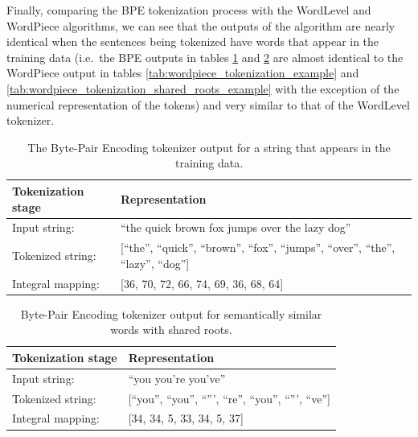 \documentclass[12pt]{article}
\begin{document}
Finally, comparing the BPE tokenization process with the WordLevel and WordPiece algorithms, we can see that the outputs of the algorithm are nearly
identical when the sentences being tokenized have words that appear in the training data (i.e.~the BPE outputs in tables
\ref{tab:bpe_tokenization_example} and \ref{tab:bpe_shared_roots_example} are almost identical to the WordPiece output in tables
\ref{tab:wordpiece_tokenization_example} and \ref{tab:wordpiece_tokenization_shared_roots_example} with the exception of the numerical representation
of the tokens) and very similar to that of the WordLevel tokenizer.

\begin{table}[!t]
    \centering
    \begin{tabular}{l l}
        \toprule
        Tokenization stage & Representation                                                                            \\
        \midrule
        Input string:      & ``the quick brown fox jumps over the lazy dog''                                           \\
        Tokenized string:  & [``the'', ``quick'', ``brown'', ``fox'', ``jumps'', ``over'', ``the'', ``lazy'', ``dog''] \\
        Integral mapping:  & [36, 70, 72, 66, 74, 69, 36, 68, 64]                                                      \\
        \bottomrule
    \end{tabular}
    \caption{The Byte-Pair Encoding tokenizer output for a string that appears in the training data.}
    \label{tab:bpe_tokenization_example}
\end{table}

\begin{table}[!t]
    \centering
    \begin{tabular}{l l}
        \toprule
        Tokenization stage & Representation                                            \\
        \midrule
        Input string:      & ``you you're you've''                                     \\
        Tokenized string:  & [``you'', ``you'', ``''', ``re'', ``you'', ``''', ``ve''] \\
        Integral mapping:  & [34, 34, 5, 33, 34, 5, 37]                                \\
        \bottomrule
    \end{tabular}
    \caption{Byte-Pair Encoding tokenizer output for semantically similar words with shared roots.}
    \label{tab:bpe_shared_roots_example}
\end{table}
\end{document}
